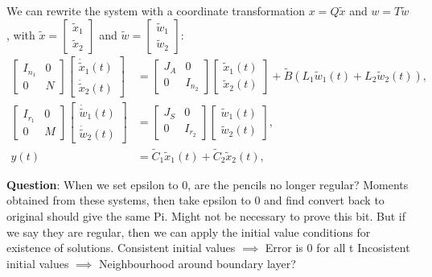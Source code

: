 \documentclass{article}
\begin{document}
We can rewrite the system with a coordinate transformation \(x = Q \tilde{x}\) and \(w = T \tilde{w}\), 
with $\tilde{x} = \begin{bmatrix}\tilde{x}_1 \\ \tilde{x}_2 \end{bmatrix}$ and
$\tilde{w} = \begin{bmatrix}\tilde{w}_1 \\ \tilde{w}_2 \end{bmatrix}$:
\begin{equation}
\begin{aligned}
\begin{bmatrix}
I_{n_1} & 0 \\
0 & N
\end{bmatrix} \begin{bmatrix}
\dot{\tilde{x}}_1(t) \\
\dot{\tilde{x}}_2(t)
\end{bmatrix} &= \begin{bmatrix}
J_A & 0 \\
0 & I_{n_2}
\end{bmatrix} \begin{bmatrix}
\tilde{x}_1(t) \\
\tilde{x}_2(t)
\end{bmatrix} + \tilde{B} (L_1 \tilde{w}_1(t) + L_2 \tilde{w}_2(t)), \\
\begin{bmatrix}
I_{r_1} & 0 \\
0 & M
\end{bmatrix} \begin{bmatrix}
\dot{\tilde{w}}_1(t) \\
\dot{\tilde{w}}_2(t)
\end{bmatrix} &= \begin{bmatrix}
J_S & 0 \\
0 & I_{r_2}
\end{bmatrix} \begin{bmatrix}
\tilde{w}_1(t) \\
\tilde{w}_2(t)
\end{bmatrix}, \\
y(t) &= \tilde{C}_1 \tilde{x}_1(t) + \tilde{C}_2 \tilde{x}_2(t),
\end{aligned}
\end{equation}

\textbf{Question}: When we set epsilon to 0, are the pencils no longer regular?
\newline
Moments obtained from these systems, then take epsilon to 0 and find convert back to original
should give the same Pi. 
Might not be necessary to prove this bit. 
But if we say they are regular, then we can apply the initial value conditions for existence of solutions.
\newline 
Consistent initial values $\implies$ Error is 0 for all t
\newline
Incosistent initial values $\implies$ Neighbourhood around boundary layer?
\end{document}
